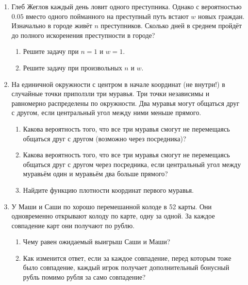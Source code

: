 \documentclass[12pt]{article}
\begin{document}
\begin{enumerate}
     \item %
     Глеб Жеглов каждый день ловит одного преступника. 
     Однако с вероятностью $0.05$ вместо одного пойманного на преступный путь встают $w$ новых граждан. 
     Изначально в городе живёт $n$ преступников.
     Сколько дней в среднем пройдёт до полного искоренения преступности в городе?
     \begin{enumerate}
         \item Решите задачу при $n = 1$ и $w = 1$.
         \item Решите задачу при произвольных $n$ и $w$.
     \end{enumerate}
     \item %
     На единичной окружности с центром в начале координат (не внутри!) в случайные точки приползли три муравья.
     Три точки  независимы и равномерно распределены по окружности. 
     Два муравья могут общаться друг с другом, если центральный угол между ними меньше прямого. 
 
 \begin{enumerate}
     \item Какова вероятность того, что все три муравья смогут не перемещаясь общаться друг с другом (возможно
     через посредника)?
     \item Какова вероятность того, что все три муравья смогут не перемещаясь общаться друг с другом через посредника, 
     если центральный угол между муравьём один и муравьём два больше прямого?
     \item Найдите функцию плотности координат первого муравья. 
 \end{enumerate}

 \item У Маши и Саши по хорошо перемешанной колоде в 52 карты. 
 Они одновременно открывают колоду по карте, одну за одной.
 За каждое совпадение карт они получают по рублю. 
 \begin{enumerate}
    \item Чему равен ожидаемый выигрыш Саши и Маши?
    \item Как изменится ответ, если за каждое совпадение, перед которым тоже было совпадение, каждый игрок получает дополнительный бонусный рубль помимо рубля за само совпадение?
\end{enumerate}
 
\end{enumerate}
\end{document}
